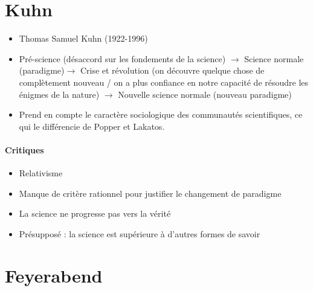 \documentclass[fleqn,letterpaper, 12pt]{article}
\begin{document}
	\section{Kuhn}
	
	\begin{itemize}
		\item Thomas Samuel Kuhn (1922-1996)
		\item Pré-science (désaccord sur les fondements de la science) $\rightarrow$ Science normale (paradigme)$\rightarrow$ Crise et révolution (on découvre quelque chose de complètement nouveau / on a plus confiance en notre capacité de résoudre les énigmes de la nature) $\rightarrow$ Nouvelle science normale (nouveau paradigme)
		\item Prend en compte le caractère sociologique des communautés scientifiques, ce qui le différencie de Popper et Lakatos.
	\end{itemize}

	\paragraph{Critiques}
	\begin{itemize}
		\item Relativisme
		\item Manque de critère rationnel pour justifier le changement de paradigme
		\item La science ne progresse pas vers la vérité
		\item Présupposé : la science est supérieure à d'autres formes de savoir
	\end{itemize}
	
	
	\section{Feyerabend}
	
\end{document}

